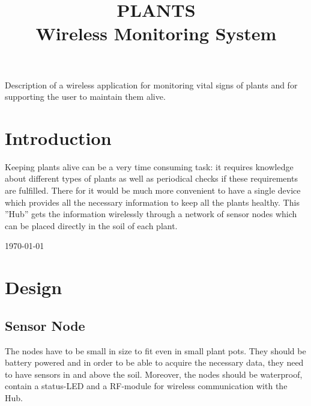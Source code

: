 \documentclass[conference]{IEEEtran}
\begin{document}
\title{PLANTS\\Wireless Monitoring System}

\author{
\and
{}
\and
{}
}

\maketitle
Description of a wireless application for monitoring vital signs of plants and for supporting the user to maintain them alive. 
\begin{abstract}

\end{abstract}

\IEEEpeerreviewmaketitle



\section{Introduction}
Keeping plants alive can be a very time consuming task: it requires knowledge about different types of plants as well as periodical checks if these requirements are fulfilled. There for it would be much more convenient to have a single device which provides all the necessary information to keep all the plants healthy. This ''Hub'' gets the information wirelessly through a network of sensor nodes which can be placed directly in the soil of each plant.
 
\hfill \today

\section{Design}
\subsection{Sensor Node}
The nodes have to be small in size to fit even in small plant pots. They should be battery powered and in order to be able to acquire the necessary data, they need to have sensors in and above the soil. Moreover, the nodes should be waterproof, contain a status-LED and a RF-module for wireless communication with the Hub.
\end{document}
